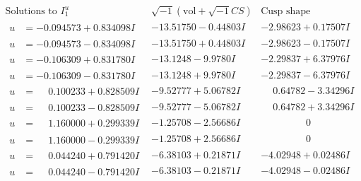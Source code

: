 \documentclass[1p]{elsarticle_modified}
\theoremstyle{definition}
\newcommand{\I}{\sqrt{-1}}
\begin{document}
$$\begin{array}{c|c|c}  
\text{Solutions to }I^u_{1}& \I (\text{vol} + \sqrt{-1}CS) & \text{Cusp shape}\\
 \hline 
\begin{aligned}
u &= -0.094573 + 0.834098 I\end{aligned}
 & -13.51750 - 0.44803 I & -2.98623 + 0.17507 I \\ \hline\begin{aligned}
u &= -0.094573 - 0.834098 I\end{aligned}
 & -13.51750 + 0.44803 I & -2.98623 - 0.17507 I \\ \hline\begin{aligned}
u &= -0.106309 + 0.831780 I\end{aligned}
 & -13.1248 - 9.9780 I & -2.29837 + 6.37976 I \\ \hline\begin{aligned}
u &= -0.106309 - 0.831780 I\end{aligned}
 & -13.1248 + 9.9780 I & -2.29837 - 6.37976 I \\ \hline\begin{aligned}
u &= \phantom{-}0.100233 + 0.828509 I\end{aligned}
 & -9.52777 + 5.06782 I & \phantom{-}0.64782 - 3.34296 I \\ \hline\begin{aligned}
u &= \phantom{-}0.100233 - 0.828509 I\end{aligned}
 & -9.52777 - 5.06782 I & \phantom{-}0.64782 + 3.34296 I \\ \hline\begin{aligned}
u &= \phantom{-}1.160000 + 0.299339 I\end{aligned}
 & -1.25708 - 2.56686 I & \phantom{-0.000000 } 0 \\ \hline\begin{aligned}
u &= \phantom{-}1.160000 - 0.299339 I\end{aligned}
 & -1.25708 + 2.56686 I & \phantom{-0.000000 } 0 \\ \hline\begin{aligned}
u &= \phantom{-}0.044240 + 0.791420 I\end{aligned}
 & -6.38103 + 0.21871 I & -4.02948 + 0.02486 I \\ \hline\begin{aligned}
u &= \phantom{-}0.044240 - 0.791420 I\end{aligned}
 & -6.38103 - 0.21871 I & -4.02948 - 0.02486 I \\ \hline\begin{aligned}

\end{aligned}
\end{array}$$
\end{document}
